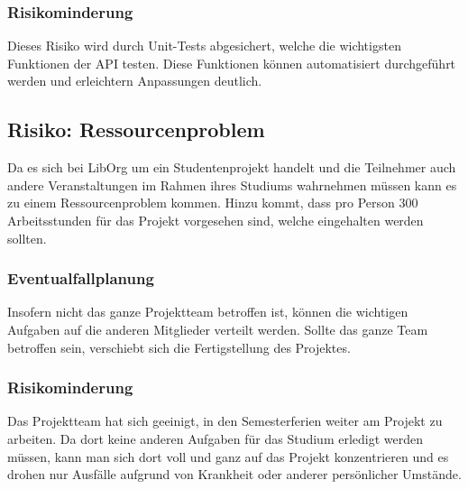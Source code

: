 \subsubsection{Risikominderung}
Dieses Risiko wird durch Unit-Tests abgesichert, welche die wichtigsten Funktionen der API testen. Diese Funktionen können automatisiert durchgeführt werden und erleichtern Anpassungen deutlich.

\subsection{Risiko: Ressourcenproblem}
Da es sich bei LibOrg um ein Studentenprojekt handelt und die Teilnehmer auch andere Veranstaltungen im Rahmen ihres Studiums wahrnehmen müssen kann es zu einem Ressourcenproblem kommen. Hinzu kommt, dass pro Person 300 Arbeitsstunden für das Projekt vorgesehen sind, welche eingehalten werden sollten.
\subsubsection{Eventualfallplanung}
Insofern nicht das ganze Projektteam betroffen ist, können die wichtigen Aufgaben auf die anderen Mitglieder verteilt werden. Sollte das ganze Team betroffen sein, verschiebt sich die Fertigstellung des Projektes. 
\subsubsection{Risikominderung}
Das Projektteam hat sich geeinigt, in den Semesterferien weiter am Projekt zu arbeiten. Da dort keine anderen Aufgaben für das Studium erledigt werden müssen, kann man sich dort voll und ganz auf das Projekt konzentrieren und es drohen nur Ausfälle aufgrund von Krankheit oder anderer persönlicher Umstände.

